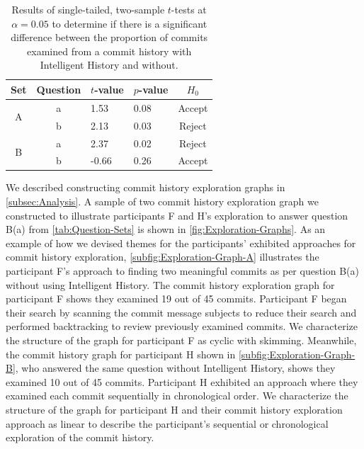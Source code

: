 \begin{table}[h]
  \caption{
    Results of single-tailed, two-sample $t$-tests at $\alpha = 0.05$ to determine if there is a significant difference between the proportion of commits examined from a commit history
    with Intelligent History and without.
  }
  \centering
  \begin{tabular}{@{}ccllc@{}}
    \toprule
    Set                                     & Question               & \multicolumn{1}{c}{$t$-value} & \multicolumn{1}{c}{$p$-value} & $H_{0}$ \\ \midrule
    \multicolumn{1}{c|}{\multirow{2}{*}{A}} & \multicolumn{1}{c|}{a} & 1.53                        & 0.08                        & Accept   \\ \cmidrule(l){2-5} 
    \multicolumn{1}{c|}{}                   & \multicolumn{1}{c|}{b} & 2.13                        & 0.03                        & Reject   \\ \midrule
    \multicolumn{1}{c|}{\multirow{2}{*}{B}} & \multicolumn{1}{c|}{a} & 2.37                        & 0.02                        & Reject   \\ \cmidrule(l){2-5} 
    \multicolumn{1}{c|}{}                   & \multicolumn{1}{c|}{b} & -0.66                       & 0.26                        & Accept   \\ \bottomrule
  \end{tabular}
  \label{tab:t-test}
\end{table}

We described constructing commit history exploration graphs in \autoref{subsec:Analysis}. 
A sample of two commit history exploration graph we constructed to illustrate participants F and H’s exploration to answer question B(a) from \autoref{tab:Question-Sets} is shown in \autoref{fig:Exploration-Graphs}.
As an example of how we devised themes for the participants' exhibited approaches for commit history exploration, \autoref{subfig:Exploration-Graph-A} illustrates the participant F's approach to finding two meaningful commits as per question B(a) without using Intelligent History.
The commit history exploration graph for participant F shows they examined 19 out of 45 commits.
Participant F began their search by scanning the commit message subjects to reduce their search and performed backtracking to review previously examined commits.
We characterize the structure of the graph for participant F as cyclic with skimming.
Meanwhile, the commit history graph for participant H shown in \autoref{subfig:Exploration-Graph-B}, who answered the same question without Intelligent History, shows they examined 10 out of 45 commits.
Participant H exhibited an approach where they examined each commit sequentially in chronological order.
We characterize the structure of the graph for participant H and their commit history exploration approach as linear to describe the participant's sequential or chronological exploration of the commit history.

